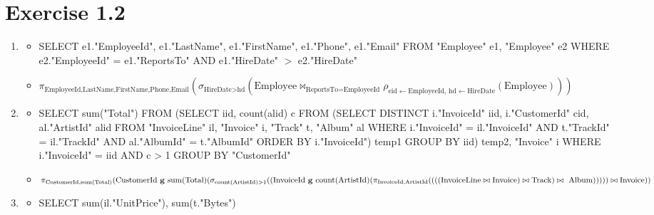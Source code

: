 \documentclass[10pt]{article}
\begin{document}
  \section*{Exercise 1.2}
  \begin{enumerate}[label=\arabic*.]
  \item
  	\begin{itemize}
    \item
 	SELECT e1."EmployeeId", e1."LastName", e1."FirstName", e1."Phone", e1."Email" 
	FROM "Employee" e1, "Employee" e2 
	WHERE e2."EmployeeId" =  e1."ReportsTo" AND e1."HireDate" $>$ e2."HireDate"
    \item
    $\pi_{\text{EmployeeId,LastName,FirstName,Phone,Email}}(\sigma_{\text{HireDate} > \text{hd}}(\text{Employee} \bowtie_{\text{ReportsTo=EmployeeId}} \rho_{\text{eid} \leftarrow \text{EmployeeId, hd} \leftarrow \text{HireDate}}(\text{Employee})))$
    \end{itemize}
  \item
  	\begin{itemize}
    \item
  SELECT sum("Total") FROM 
	(SELECT iid, count(alid) c FROM (SELECT DISTINCT i."InvoiceId" iid, i."CustomerId" cid, al."ArtistId" alid FROM "InvoiceLine" il, "Invoice" i, "Track" t, "Album" al
	WHERE i."InvoiceId" = il."InvoiceId" AND t."TrackId" = il."TrackId" AND al."AlbumId" = t."AlbumId" ORDER BY i."InvoiceId") temp1 GROUP BY iid) temp2,
	"Invoice" i
WHERE
i."InvoiceId" = iid AND c > 1 GROUP BY "CustomerId"
    \item
    $\pi_{\text{CustomerId,sum(Total)}}(\text{CustomerId \textbf{g} sum(Total)}(\sigma_{\text{count(ArtistId)>1}}((\text{InvoiceId \textbf{g} count(ArtistId)}(\pi_{\text{InvoiceId,ArtistId}}((((\text{InvoiceLine} \bowtie \text{Invoice}) \bowtie \text{Track}) \bowtie\text{ Album})))))\bowtie \text{Invoice}))$
    \end{itemize}
  \item
  	\begin{itemize}
    \item
    SELECT sum(il."UnitPrice"), sum(t."Bytes")

\end{itemize}
\end{enumerate}
\end{document}
